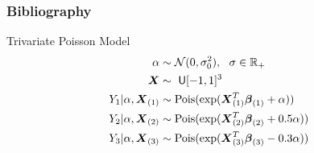 \documentclass[9pt,notes=hide]{beamer}
\newcommand{\vect}[1]{\boldsymbol #1}
\newcommand{\R}{\mathbb R}
\newcommand{\vbe}{\vect{\beta}}
\newcommand{\X}{\vect{X}}
\begin{document}
\begin{frame}[allowframebreaks]
	\frametitle{Bibliography}
	\printbibliography
\end{frame}

\appendix

\begin{frame}{Trivariate Poisson Model}
	\begin{align*}
		\alpha               & \sim  \mathcal{N}(0, \sigma_{0}^2),  \  \ \sigma \in \R_+ \nonumber  \\
		\X                   & \sim   \ {\sf U}[-1, 1]^3  \nonumber                                 \\
		Y_1|\alpha, \X_{(1)} & \sim \text{Pois}(\exp(\X_{(1)}^T\vbe_{(1)} + \alpha))  \nonumber     \\
		Y_2|\alpha, \X_{(2)} & \sim  \text{Pois}(\exp(\X_{(2)}^T\vbe_{(2)} + 0.5\alpha))            \\
		Y_3|\alpha, \X_{(3)} & \sim  \text{Pois}(\exp(\X_{(3)}^T\vbe_{(3)} - 0.3\alpha))  \nonumber
	\end{align*}
\end{frame}
\end{document}
